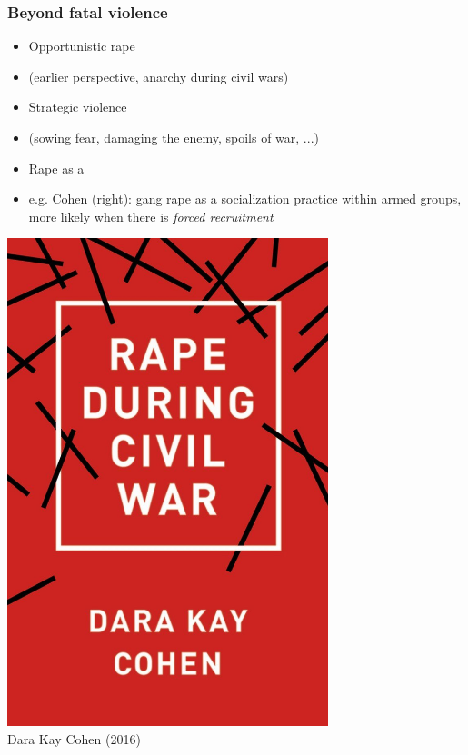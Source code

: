 \documentclass[aspectratio=43]{beamer}
\begin{document}
\begin{frame}
\frametitle{Beyond fatal violence}
\centering

\begin{minipage}{0.65\textwidth}\centering
  \begin{itemize}[<+->]
    \item<2->[1.] Opportunistic rape
    \item<2->[] {\small (earlier perspective, anarchy during civil wars)}
    \item<3->[2.] Strategic violence
    \item<3->[] {\small (sowing fear, damaging the enemy, spoils of war, ...)}
    \item<4->[3.] Rape as a 
    \item<5->[] e.g. Cohen (right): gang rape as a socialization practice within armed groups, more likely when there is \textit{forced recruitment}
  \end{itemize}
\end{minipage}\hfill
\begin{minipage}{0.34\textwidth}\centering
\includegraphics[width = 0.7\textwidth]{img/cohen_rape}\\Dara Kay Cohen (2016)
\end{minipage}

\end{frame}
\end{document}
